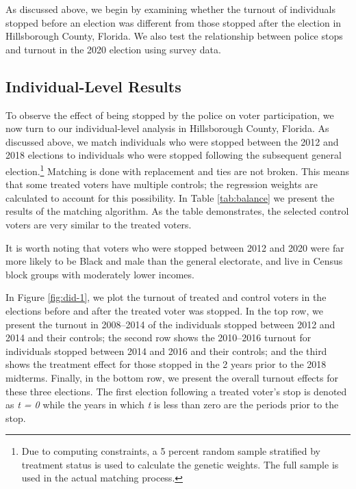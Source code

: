 \documentclass[
  12pt,
]{article}
\begin{document}
As discussed above, we begin by examining whether the turnout of individuals stopped before an election was different from those stopped after the election in Hillsborough County, Florida.
We also test the relationship between police stops and turnout in the 2020 election using survey data.

\hypertarget{individual-level-results}{%
\subsection*{Individual-Level Results}\label{individual-level-results}}

To observe the effect of being stopped by the police on voter participation, we now turn to our individual-level analysis in Hillsborough County, Florida. As discussed above, we match individuals who were stopped between the 2012 and 2018 elections to individuals who were stopped following the subsequent general election.\footnote{Due to computing constraints, a 5 percent random sample stratified by treatment status is used to calculate the genetic weights. The full sample is used in the actual matching process.} Matching is done with replacement and ties are not broken. This means that some treated voters have multiple controls; the regression weights are calculated to account for this possibility. In Table \ref{tab:balance} we present the results of the matching algorithm. As the table demonstrates, the selected control voters are very similar to the treated voters.

\begin{singlespace}

\end{singlespace}

It is worth noting that voters who were stopped between 2012 and 2020 were far more likely to be Black and male than the general electorate, and live in Census block groups with moderately lower incomes.

In Figure \ref{fig:did-1}, we plot the turnout of treated and control voters in the elections before and after the treated voter was stopped. In the top row, we present the turnout in 2008--2014 of the individuals stopped between 2012 and 2014 and their controls; the second row shows the 2010--2016 turnout for individuals stopped between 2014 and 2016 and their controls; and the third shows the treatment effect for those stopped in the 2 years prior to the 2018 midterms. Finally, in the bottom row, we present the overall turnout effects for these three elections. The first election following a treated voter's stop is denoted as \emph{t = 0} while the years in which \emph{t} is less than zero are the periods prior to the stop.
\end{document}
